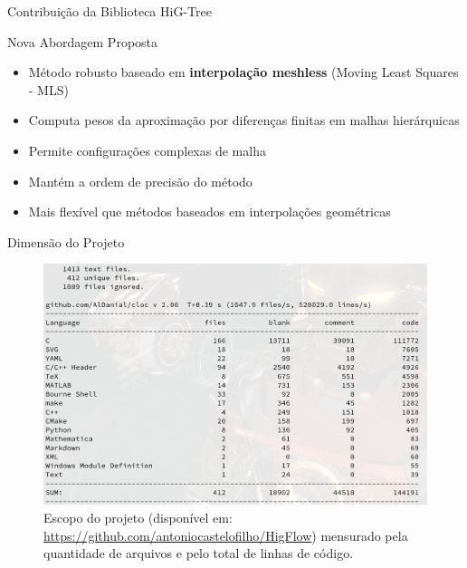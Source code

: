 \documentclass[aspectratio=169,t,xcolor=table]{beamer}
\begin{document}
\begin{frame}{Contribuição da Biblioteca HiG-Tree}
\begin{block}{Nova Abordagem Proposta}
\begin{itemize}
\item Método robusto baseado em \textbf{interpolação meshless} (Moving Least Squares - MLS)
\item Computa pesos da aproximação por diferenças finitas em malhas hierárquicas
\item Permite configurações complexas de malha
\item Mantém a ordem de precisão do método
\item Mais flexível que métodos baseados em interpolações geométricas
\end{itemize}
\end{block}
\end{frame}


\begin{frame}{\smaller \smaller Dimensão do Projeto}
	
	\begin{figure}
		\vspace{-0.3cm}
		\centering
    \caption{\smaller Escopo do projeto (disponível em:
    \url{https://github.com/antoniocastelofilho/HigFlow}) mensurado pela
  quantidade de arquivos e pelo total de linhas de código.}
		\includegraphics[height=0.7\textheight]{imgs/dimencao_do_projeto.png}
	\end{figure}
\end{frame}



 

 
\end{document}
